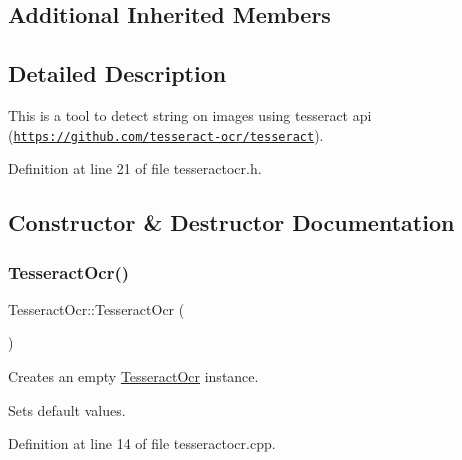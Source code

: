 \subsection*{Additional Inherited Members}


\subsection{Detailed Description}
This is a tool to detect string on images using tesseract api (\href{https://github.com/tesseract-ocr/tesseract}{\tt https\+://github.\+com/tesseract-\/ocr/tesseract}). 

Definition at line 21 of file tesseractocr.\+h.



\subsection{Constructor \& Destructor Documentation}
\mbox{\label{classTesseractOcr_a9e62c15a4f8e4c8a0a614cf04ec8dea6}} 
\subsubsection{\texorpdfstring{Tesseract\+Ocr()}{TesseractOcr()}\hspace{0.1cm}{\footnotesize\ttfamily [1/3]}}
{\footnotesize\ttfamily Tesseract\+Ocr\+::\+Tesseract\+Ocr (\begin{DoxyParamCaption}{ }\end{DoxyParamCaption})}



Creates an empty \mbox{\hyperlink{classTesseractOcr}{Tesseract\+Ocr}} instance. 

Sets default values. 

Definition at line 14 of file tesseractocr.\+cpp.

\mbox{\label{classTesseractOcr_ad550fd8468a1b1ee0b915c7202281dc7}} 
